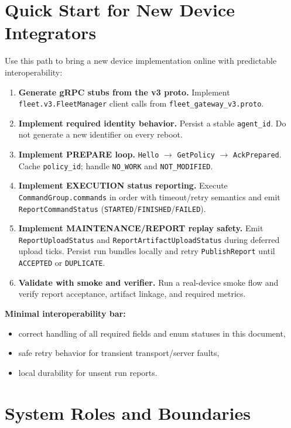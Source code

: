\documentclass[11pt,a4paper]{article}
\begin{document}
\section{Quick Start for New Device Integrators}
Use this path to bring a new device implementation online with predictable interoperability:
\begin{enumerate}
  \item \textbf{Generate gRPC stubs from the v3 proto.}
  Implement \texttt{fleet.v3.FleetManager} client calls from \texttt{fleet\_gateway\_v3.proto}.
  \item \textbf{Implement required identity behavior.}
  Persist a stable \texttt{agent\_id}. Do not generate a new identifier on every reboot.
  \item \textbf{Implement PREPARE loop.}
  \texttt{Hello} $\rightarrow$ \texttt{GetPolicy} $\rightarrow$ \texttt{AckPrepared}.
  Cache \texttt{policy\_id}; handle \texttt{NO\_WORK} and \texttt{NOT\_MODIFIED}.
  \item \textbf{Implement EXECUTION status reporting.}
  Execute \texttt{CommandGroup.commands} in order with timeout/retry semantics and emit
  \texttt{ReportCommandStatus} (\texttt{STARTED}/\texttt{FINISHED}/\texttt{FAILED}).
  \item \textbf{Implement MAINTENANCE/REPORT replay safety.}
  Emit \texttt{ReportUploadStatus} and \texttt{ReportArtifactUploadStatus} during deferred upload ticks.
  Persist run bundles locally and retry \texttt{PublishReport} until \texttt{ACCEPTED} or \texttt{DUPLICATE}.
  \item \textbf{Validate with smoke and verifier.}
  Run a real-device smoke flow and verify report acceptance, artifact linkage, and required metrics.
\end{enumerate}

\textbf{Minimal interoperability bar:}
\begin{itemize}
  \item correct handling of all required fields and enum statuses in this document,
  \item safe retry behavior for transient transport/server faults,
  \item local durability for unsent run reports.
\end{itemize}

\section{System Roles and Boundaries}
\end{document}

